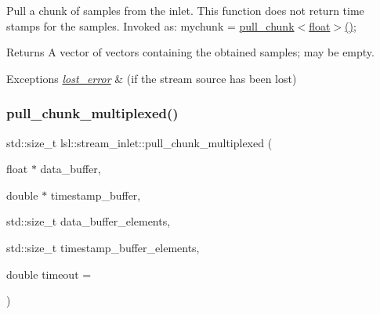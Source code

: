 Pull a chunk of samples from the inlet. This function does not return time stamps for the samples. Invoked as\+: mychunk = \hyperlink{classlsl_1_1stream__inlet_a558f53812f5dc3c19b2cbe0026a61f6a}{pull\+\_\+chunk$<$float$>$()}; \begin{DoxyReturn}{Returns}
A vector of vectors containing the obtained samples; may be empty. 
\end{DoxyReturn}

\begin{DoxyExceptions}{Exceptions}
{\em \hyperlink{classlsl_1_1lost__error}{lost\+\_\+error}} & (if the stream source has been lost) \\
\hline
\end{DoxyExceptions}
\mbox{\label{classlsl_1_1stream__inlet_a97adf2cb7d60e4b47bf25217a2b17964}} 
\subsubsection{\texorpdfstring{pull\+\_\+chunk\+\_\+multiplexed()}{pull\_chunk\_multiplexed()}\hspace{0.1cm}{\footnotesize\ttfamily [1/2]}}
{\footnotesize\ttfamily std\+::size\+\_\+t lsl\+::stream\+\_\+inlet\+::pull\+\_\+chunk\+\_\+multiplexed (\begin{DoxyParamCaption}\item[{float $\ast$}]{data\+\_\+buffer,  }\item[{double $\ast$}]{timestamp\+\_\+buffer,  }\item[{std\+::size\+\_\+t}]{data\+\_\+buffer\+\_\+elements,  }\item[{std\+::size\+\_\+t}]{timestamp\+\_\+buffer\+\_\+elements,  }\item[{double}]{timeout = {} }\end{DoxyParamCaption})\hspace{0.3cm}{\ttfamily [inline]}}

